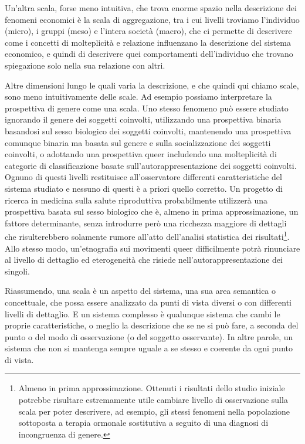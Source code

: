 \documentclass[a4paper, headings=standardclasses]{scrartcl}
\begin{document}
Un'altra scala, forse meno intuitiva, che trova enorme spazio nella descrizione dei fenomeni economici è la scala di aggregazione, tra i cui livelli troviamo l'individuo (micro), i gruppi (meso) e l'intera società (macro), che ci permette di descrivere come i concetti di molteplicità e relazione influenzano la descrizione del sistema economico, e quindi di descrivere quei comportamenti dell'individuo che trovano spiegazione solo nella sua relazione con altri.

Altre dimensioni lungo le quali varia la descrizione, e che quindi qui chiamo scale, sono meno intuitivamente delle scale.
Ad esempio possiamo interpretare la prospettiva di genere come una scala.
Uno stesso fenomeno può essere studiato ignorando il genere dei soggetti coinvolti, utilizzando una prospettiva binaria basandosi sul sesso biologico dei soggetti coinvolti, mantenendo una prospettiva comunque binaria ma basata sul genere e sulla socializzazione dei soggetti coinvolti, o adottando una prospettiva queer includendo una molteplicità di categorie di classificazione basate sull'autorappresentazione dei soggetti coinvolti.
Ognuno di questi livelli restituisce all'osservatore differenti caratteristiche del sistema studiato e nessuno di questi è a priori quello corretto.
Un progetto di ricerca in medicina sulla salute riproduttiva probabilmente utilizzerà una prospettiva basata sul sesso biologico che è, almeno in prima approssimazione, un fattore determinante, senza introdurre però una ricchezza maggiore di dettagli che risulterebbero solamente rumore all'atto dell'analisi statistica dei risultati\footnote{Almeno in prima approssimazione. Ottenuti i risultati dello studio iniziale potrebbe risultare estremamente utile cambiare livello di osservazione sulla scala per poter descrivere, ad esempio, gli stessi fenomeni nella popolazione sottoposta a terapia ormonale sostitutiva a seguito di una diagnosi di incongruenza di genere.}.
Allo stesso modo, un'etnografia sui movimenti queer difficilmente potrà rinunciare al livello di dettaglio ed eterogeneità che risiede nell'autorappresentazione dei singoli.

Riassumendo, una scala è un aspetto del sistema, una sua area semantica o concettuale, che possa essere analizzato da punti di vista diversi o con differenti livelli di dettaglio.
E un sistema complesso è qualunque sistema che cambi le proprie caratteristiche, o meglio la descrizione che se ne si può fare, a seconda del punto o del modo di osservazione (o del soggetto osservante). In altre parole, un sistema che non si mantenga sempre uguale a se stesso e coerente da ogni punto di vista.
\end{document}
